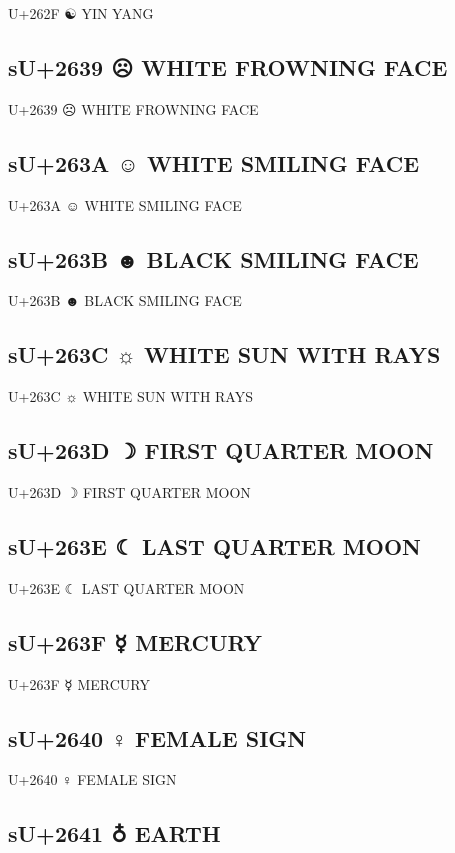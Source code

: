 U+262F ☯ YIN YANG

\subsection{sU+2639 ☹ WHITE FROWNING FACE}

U+2639 ☹ WHITE FROWNING FACE

\subsection{sU+263A ☺ WHITE SMILING FACE}

U+263A ☺ WHITE SMILING FACE

\subsection{sU+263B ☻ BLACK SMILING FACE}

U+263B ☻ BLACK SMILING FACE

\subsection{sU+263C ☼ WHITE SUN WITH RAYS}

U+263C ☼ WHITE SUN WITH RAYS

\subsection{sU+263D ☽ FIRST QUARTER MOON}

U+263D ☽ FIRST QUARTER MOON

\subsection{sU+263E ☾ LAST QUARTER MOON}

U+263E ☾ LAST QUARTER MOON

\subsection{sU+263F ☿ MERCURY}

U+263F ☿ MERCURY

\subsection{sU+2640 ♀ FEMALE SIGN}

U+2640 ♀ FEMALE SIGN

\subsection{sU+2641 ♁ EARTH}

